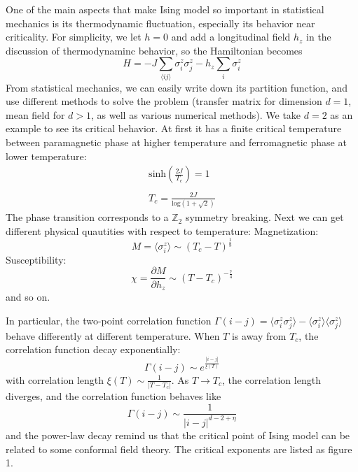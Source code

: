 \documentclass[12pt]{article}
\begin{document}
One of the main aspects that make Ising model so important in statistical mechanics is its thermodynamic fluctuation, especially its behavior near criticality. For simplicity, we let $h=0$ and add a longitudinal field $h_z$ in the  discussion of thermodynaminc behavior, so the Hamiltonian becomes
\begin{equation}
		H=-J\sum_{\langle ij\rangle}\sigma^z_i\sigma^z_j-h_z\sum_i\sigma_i^z
\end{equation}
From statistical mechanics, we can easily write down its partition function, and use different methods to solve the problem (transfer matrix for dimension $d=1$, mean field for $d>1$, as well as various numerical methods). We take $d=2$ as an example to see its critical behavior. At first it has a finite critical temperature between paramagnetic phase at higher temperature and ferromagnetic phase at lower temperature:
\begin{equation}
\begin{align}
	\mathrm{sinh}\left(\frac{2J}{T_c}\right)=1\\
	\\
	T_c=\frac{2J}{\mathrm{log}(1+\sqrt{2})}
\end{align} 
\end{equation}
The phase transition corresponds to a $\mathbb{Z}_2$ symmetry breaking. Next we can get different physical quautities with respect to temperature:
Magnetization:
\begin{equation}
	M=\langle\sigma_i^z\rangle\sim(T_c-T)^{\frac{1}{8}}
\end{equation}
Susceptibility:
\begin{equation}
	\chi=\frac{\partial M}{\partial h_z}\sim(T-T_c)^{-\frac{7}{4}}
\end{equation}
and so on. 

In particular, the two-point correlation function $\Gamma(i-j)=\langle\sigma_i^z\sigma_j^z\rangle-\langle\sigma_i^z\rangle\langle\sigma_j^z\rangle$ behave differently at different temperature. When $T$ is away from $T_c$, the correlation function decay exponentially:
\begin{equation}
	\Gamma(i-j)\sim e^{\frac{|i-j|}{\xi(T)}}
\end{equation}
with correlation length $\xi(T)\sim\frac{1}{|T-T_c|}$. As $T\rightarrow T_c$, the correlation length diverges, and the correlation function behaves like
\begin{equation}
	\Gamma(i-j)\sim\frac{1}{|i-j|^{d-2+\eta}}
\end{equation}
and the power-law decay remind us that the critical point of Ising model can be related to some conformal field theory. The critical exponents are listed as figure 1.
\end{document}
